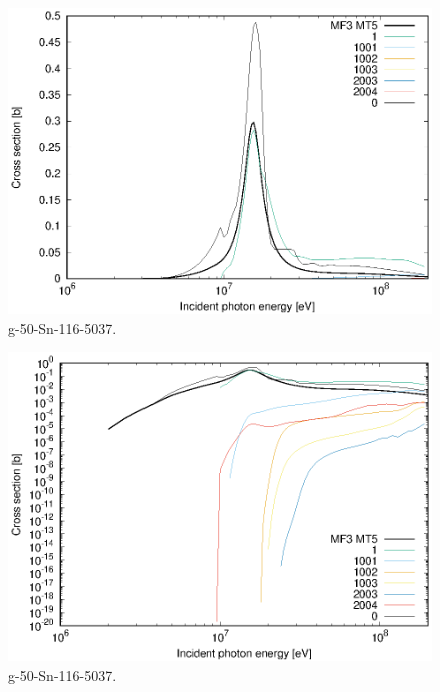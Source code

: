 \begin{figure}
 \includegraphics[width=\linewidth]{eps/g_50-Sn-116_5037.eps}
  \caption{g-50-Sn-116-5037.}
\end{figure}
\begin{figure}
 \includegraphics[width=\linewidth]{eps-log/g_50-Sn-116_5037.eps}
 \caption{g-50-Sn-116-5037.}
\end{figure}
\newpage \clearpage

